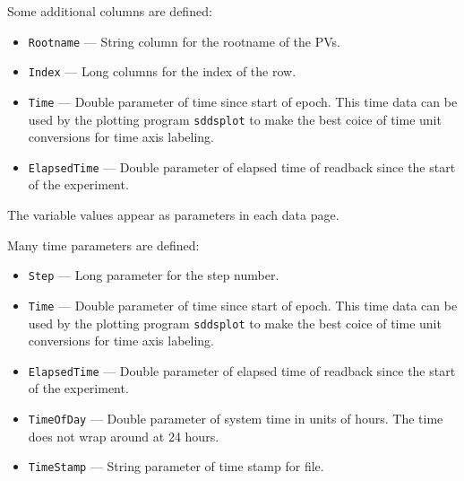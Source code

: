 \begin{itemize}
\begin{itemize}
Some additional columns are defined:
\begin{itemize}
   \item {\verb+Rootname+} --- String column for the rootname of the PVs.
   \item {\verb+Index+} --- Long columns for the index of the row.
   \item {\tt Time} --- Double parameter of time since start of epoch. This time data can be used by
        the plotting program {\verb+sddsplot+} to make the best coice of time unit conversions
        for time axis labeling.
   \item {\tt ElapsedTime} --- Double parameter of elapsed time of readback since the start of the experiment.
\end{itemize}

The variable values appear as parameters in each data page.

Many time parameters are defined:
\begin{itemize}
   \item {\verb+Step+} --- Long parameter for the step number.
   \item {\tt Time} --- Double parameter of time since start of epoch. This time data can be used by
        the plotting program {\verb+sddsplot+} to make the best coice of time unit conversions
        for time axis labeling.
   \item {\tt ElapsedTime} --- Double parameter of elapsed time of readback since the start of the experiment.
   \item {\tt TimeOfDay} --- Double parameter of system time in units of hours. 
                The time does not wrap around at 24 hours.
   \item {\tt TimeStamp} --- String parameter of time stamp for file.
\end{itemize}

\end{itemize}


\end{itemize}
